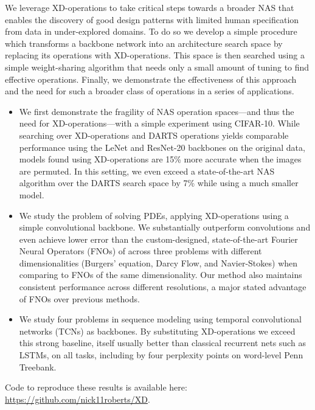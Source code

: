 We leverage XD-operations to take critical steps towards a broader NAS that enables the discovery of good design patterns with limited human specification from data in under-explored domains.
To do so we develop a simple procedure which transforms a backbone network into an architecture search space by replacing its operations with XD-operations.
This space is then searched using a simple weight-sharing algorithm that needs only a small amount of tuning to find effective operations.
Finally, we demonstrate the effectiveness of this approach and the need for such a broader class of operations in a series of applications.  
\begin{itemize}[leftmargin=*,topsep=-1pt,noitemsep]\setlength\itemsep{2pt}
	\item We first demonstrate the fragility of NAS operation spaces---and thus the need for XD-operations---with a simple experiment using CIFAR-10.
	While searching over XD-operations and DARTS operations yields comparable performance using the LeNet and ResNet-20 backbones on the original data, models found using XD-operations are 15\% more accurate when the images are permuted.
	In this setting, we even exceed a state-of-the-art NAS algorithm over the DARTS search space by 7\% while using a much smaller model.
	\item We study the problem of solving PDEs, applying XD-operations using a simple convolutional backbone.
	We substantially outperform convolutions and even achieve lower error than the custom-designed, state-of-the-art Fourier Neural Operators (FNOs) of \citet{li2021fno} across three problems with different dimensionalities (Burgers' equation, Darcy Flow, and Navier-Stokes) when comparing to FNOs of the same dimensionality.
	Our method also maintains consistent performance across different resolutions, a major stated advantage of FNOs over previous methods. 
	\item We study four problems in sequence modeling using temporal convolutional networks (TCNs) \cite{bai2018tcn} as backbones.
	By substituting XD-operations we exceed this strong baseline, itself usually better than classical recurrent nets such as LSTMs, on all tasks, including by four perplexity points on word-level Penn Treebank.
\end{itemize}

Code to reproduce these results is available here: \url{https://github.com/nick11roberts/XD}.


